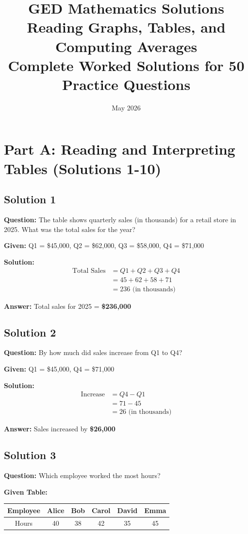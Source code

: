\documentclass[12pt,a4paper]{article}
\title{\textbf{GED Mathematics Solutions}\\[0.3cm]\Large{Reading Graphs, Tables, and Computing Averages}\\[0.2cm]\normalsize{Complete Worked Solutions for 50 Practice Questions}}
\author{}
\date{May 2026}
\begin{document}
\maketitle

\tableofcontents

\newpage

\section{Part A: Reading and Interpreting Tables (Solutions 1-10)}

\subsection*{Solution 1}
\textbf{Question:} The table shows quarterly sales (in thousands) for a retail store in 2025. What was the total sales for the year?

\textbf{Given:} Q1 = \$45,000, Q2 = \$62,000, Q3 = \$58,000, Q4 = \$71,000

\textbf{Solution:}
\begin{align*}
\text{Total Sales} &= Q1 + Q2 + Q3 + Q4 \\
&= 45 + 62 + 58 + 71 \\
&= 236 \text{ (in thousands)}
\end{align*}

\textbf{Answer:} Total sales for 2025 = \textbf{\$236,000}

\subsection*{Solution 2}
\textbf{Question:} By how much did sales increase from Q1 to Q4?

\textbf{Given:} Q1 = \$45,000, Q4 = \$71,000

\textbf{Solution:}
\begin{align*}
\text{Increase} &= Q4 - Q1 \\
&= 71 - 45 \\
&= 26 \text{ (in thousands)}
\end{align*}

\textbf{Answer:} Sales increased by \textbf{\$26,000}

\subsection*{Solution 3}
\textbf{Question:} Which employee worked the most hours?

\textbf{Given Table:}
\begin{center}
\begin{tabular}{|c|c|c|c|c|c|}
\hline
Employee & Alice & Bob & Carol & David & Emma \\
\hline
Hours & 40 & 38 & 42 & 35 & 45 \\
\hline
\end{tabular}
\end{center}
\end{document}
